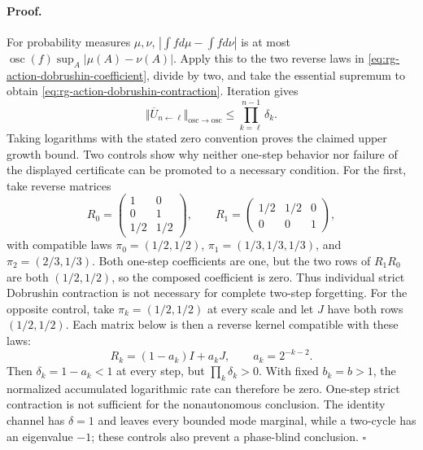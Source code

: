 \paragraph{Proof.}
For probability measures \(\mu,\nu\),
\(\left|\int f d\mu-\int f d\nu\right|\) is at most
\(\operatorname{osc}(f)\sup_A|\mu(A)-\nu(A)|\).  Apply this to the two
reverse laws in \eqref{eq:rg-action-dobrushin-coefficient}, divide by two,
and take the essential supremum to obtain
\eqref{eq:rg-action-dobrushin-contraction}.  Iteration gives
\begin{equation}
\Vert\overline U_{n\leftarrow\ell}\Vert_{\mathrm{osc}\to\mathrm{osc}}
\leq\prod_{k=\ell}^{n-1}\delta_k.
\label{eq:rg-action-dobrushin-product-bound}
\end{equation}
Taking logarithms with the stated zero convention proves the claimed upper
growth bound.  Two controls show why neither one-step behavior nor failure
of the displayed certificate can be promoted to a necessary condition.  For
the first, take reverse matrices
\begin{equation}
R_0=
\begin{pmatrix}
1&0\\0&1\\1/2&1/2
\end{pmatrix},
\qquad
R_1=
\begin{pmatrix}
1/2&1/2&0\\0&0&1
\end{pmatrix},
\label{eq:rg-dobrushin-nonnecessity-witness}
\end{equation}
with compatible laws
\(\pi_0=(1/2,1/2)\),
\(\pi_1=(1/3,1/3,1/3)\), and
\(\pi_2=(2/3,1/3)\).  Both one-step coefficients are one, but the two rows
of \(R_1R_0\) are both \((1/2,1/2)\), so the composed coefficient is zero.
Thus individual strict Dobrushin contraction is not necessary for complete
two-step forgetting.  For the opposite control, take
\(\pi_k=(1/2,1/2)\) at every scale and let \(J\) have both rows
\((1/2,1/2)\).  Each matrix below is then a reverse kernel compatible with
these laws:
\begin{equation}
R_k=(1-a_k)I+a_kJ,
\qquad a_k=2^{-k-2}.
\label{eq:rg-dobrushin-one-step-insufficient-witness}
\end{equation}
Then \(\delta_k=1-a_k<1\) at every step, but
\(\prod_k\delta_k>0\).  With fixed \(b_k=b>1\), the normalized accumulated
logarithmic rate can therefore be zero.  One-step strict contraction is not
sufficient for the nonautonomous conclusion.  The identity channel has
\(\delta=1\) and leaves every bounded mode marginal, while a two-cycle has
an eigenvalue \(-1\); these controls also prevent a phase-blind conclusion.
\(\square\)

